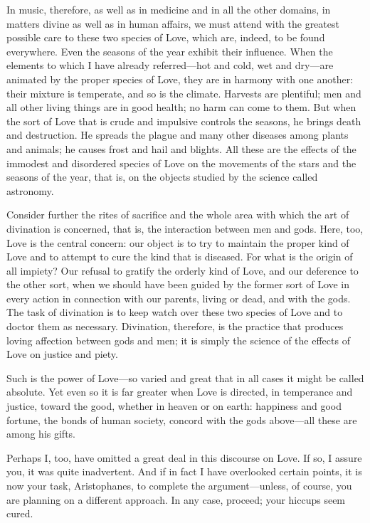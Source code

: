In music, therefore, as well as in medicine and in all the other
domains, in matters divine as well as in human affairs, we must attend
with the greatest possible care to these two species of Love, which are,
indeed, to  be found everywhere. Even the seasons of the
year exhibit their influence. When the elements to which I have already
referred---hot and cold, wet and dry---are animated by the proper
species of Love, they are in harmony with one another: their mixture is
temperate, and so is the climate. Harvests are plentiful; men and all
other living things are in good health; no harm can come to them. But
when the sort of Love that is crude and impulsive controls the seasons,
he brings death and destruction. He spreads the  plague and many
other diseases among plants and animals; he causes frost and hail and
blights. All these are the effects of the immodest and disordered
species of Love on the movements of the stars and the seasons of the
year, that is, on the objects studied by the science called astronomy.

 Consider further the rites of sacrifice and the whole area with
which the art of divination is concerned, that is, the interaction
between men and gods. Here, too, Love is the central concern: our object
is to try to maintain the proper kind of Love and to attempt to cure the
kind that is diseased. For what is the origin of all impiety? Our
refusal to gratify the orderly kind of Love, and our deference to the
other sort, when we should have been guided by the former sort of Love
in every action in connection with our parents, living or dead, and with
the gods. The task of divination is to keep watch over these two species
of Love and to doctor them as  necessary. Divination, therefore,
is the practice that produces loving affection between gods and men; it
is simply the science of the effects of Love on justice and piety.

Such is the power of Love---so varied and great that in all cases it
might be called absolute. Yet even so it is far greater when Love is
directed, in temperance and justice, toward the good, whether in heaven
or on earth: happiness and good fortune, the bonds of human society,
concord with the gods above---all these are among his gifts.

 Perhaps I, too, have omitted a great deal in this discourse on
Love. If so, I assure you, it was quite inadvertent. And if in fact I
have overlooked certain points, it is now your task, Aristophanes, to
complete the argument---unless, of course, you are planning on a
different approach. In any  case, proceed; your hiccups
seem cured.

